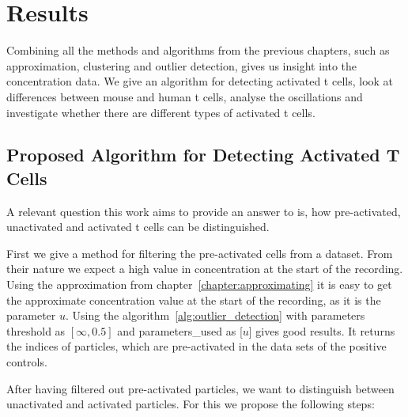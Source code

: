 \chapter{Results}
\label{chapter:results}

Combining all the methods and algorithms from the previous chapters, such as\\ approximation, clustering and outlier detection, gives us insight into the \Calcium concentration data. We give an algorithm for detecting activated t cells, look at differences between mouse and human t cells, analyse the oscillations and investigate whether there are different types of activated t cells.

\section{Proposed Algorithm for Detecting Activated T Cells}
\label{sec:proposed-algorithm}

A relevant question this work aims to provide an answer to is, how pre-activated,\\ unactivated and activated t cells can be distinguished.

First we give a method for filtering the pre-activated cells from a dataset. From their nature we expect a high value in \Calcium concentration at the start of the recording. Using the approximation from chapter~\ref{chapter:approximating} it is easy to get the approximate \Calcium concentration value at the start of the recording, as it is the parameter $u$. Using the algorithm~\ref{alg:outlier_detection} with parameters threshold as $[\infty, 0.5]$ and parameters\_used as [$u$] gives good results. It returns the indices of particles, which are pre-activated in the data sets of the positive controls.

After having filtered out pre-activated particles, we want to distinguish between\\ unactivated and activated particles. For this we propose the following steps:

